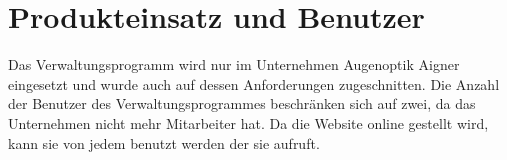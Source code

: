 \section{Produkteinsatz und Benutzer}
Das Verwaltungsprogramm wird nur im Unternehmen Augenoptik Aigner eingesetzt und wurde auch auf dessen Anforderungen zugeschnitten. Die Anzahl der Benutzer des Verwaltungsprogrammes beschränken sich auf zwei, da das Unternehmen nicht mehr Mitarbeiter hat. \newline
Da die Website online gestellt wird, kann sie von jedem benutzt werden der sie aufruft.



